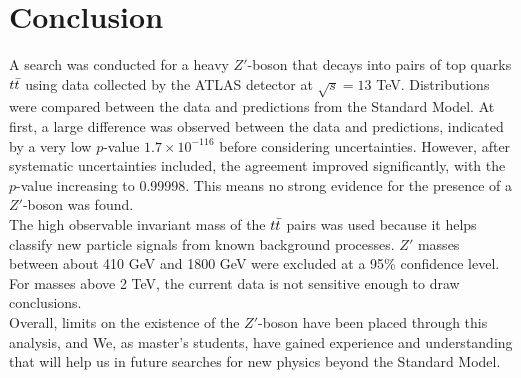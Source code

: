 \chapter{Conclusion}\label{ch:conclusion}

A search was conducted for a heavy \(Z'\)-boson that decays into pairs of top quarks \(t \Bar{t}\) using data collected by the ATLAS detector at \(\sqrt{s} = 13\) TeV. Distributions were compared between the data and predictions from the Standard Model. At first, a large difference was observed between the data and predictions, indicated by a very low \(p\)-value \(1.7 \times 10^{-116}\) before considering uncertainties. However, after systematic uncertainties included, the agreement improved significantly, with the \(p\)-value increasing to 0.99998. This means no strong evidence for the presence of a \(Z'\)-boson was found.
\\

The high observable invariant mass of the \(t \Bar{t}\) pairs was used because it helps classify new particle signals from known background processes. \(Z'\) masses between about 410 GeV and 1800 GeV were excluded at a 95\% confidence level. For masses above 2 TeV, the current data is not sensitive enough to draw conclusions.
\\

Overall, limits on the existence of the \(Z'\)-boson have been placed through this analysis, and We, as master's students, have gained experience and understanding that will help us in future searches for new physics beyond the Standard Model.



